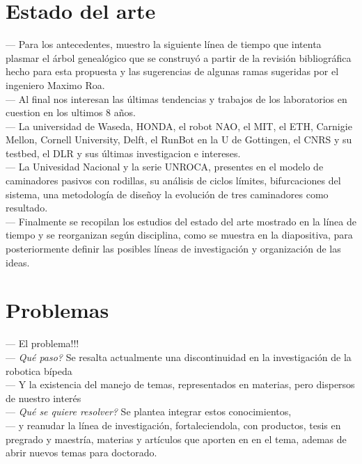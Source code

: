 \documentclass[10pt,letterpaper,oneside,onecolumn]{article}
\newcommand{\anext}{\quad[\quad$\rhd$\quad]}
\begin{document}
{  \section{Estado del arte}
  \label{sec:arte}

  --- Para los antecedentes\anext, muestro la siguiente l\'inea de tiempo que intenta plasmar el \'arbol geneal\'ogico que se construy\'o a partir de la revisi\'on bibliogr\'afica hecho para esta propuesta y las sugerencias de algunas ramas sugeridas por el ingeniero Maximo Roa.\\
  --- Al final nos interesan las \'ultimas tendencias y trabajos de los laboratorios en cuestion en los ultimos 8 a\~nos.\anext\\
  --- La universidad de Waseda\anext, HONDA\anext, el robot NAO\anext, el MIT\anext, el ETH\anext, Carnigie Mellon, Cornell University\anext, Delft\anext, el RunBot en la U de Gottingen\anext, el CNRS y su testbed\anext, el DLR y sus \'ultimas investigacion e intereses\anext.\\
  --- La Univesidad Nacional y la serie UNROCA\anext, presentes en el modelo de caminadores pasivos con rodillas\anext, su an\'alisis de ciclos l\'imites\anext, bifurcaciones del sistema\anext, una metodolog\'ia de dise\~no\anext y la evoluci\'on de tres caminadores como resultado\anext.\\
  --- Finalmente se recopilan los estudios del estado del arte mostrado en la l\'inea de tiempo y se reorganizan seg\'un disciplina, como se muestra en la diapositiva, para posteriormente definir las posibles l\'ineas de investigaci\'on y organizaci\'on de las ideas.\anext\\

  \section{Problemas}
  \label{problemas}

  --- El problema!!!\anext\\
  --- \emph{Qu\'e paso?} Se resalta actualmente una discontinuidad en la investigaci\'on de la robotica b\'ipeda\anext\\
  --- Y la existencia del manejo de temas, representados en materias, pero dispersos de nuestro inter\'es\anext\\
  --- \emph{Qu\'e se quiere resolver?} Se plantea integrar estos conocimientos,\anext\\
  --- y reanudar la l\'inea de investigaci\'on, fortaleciendola, con productos, tesis en pregrado y maestr\'ia, materias y art\'iculos que aporten en en el tema, ademas de abrir nuevos temas para doctorado.\anext\\

}
\end{document}

